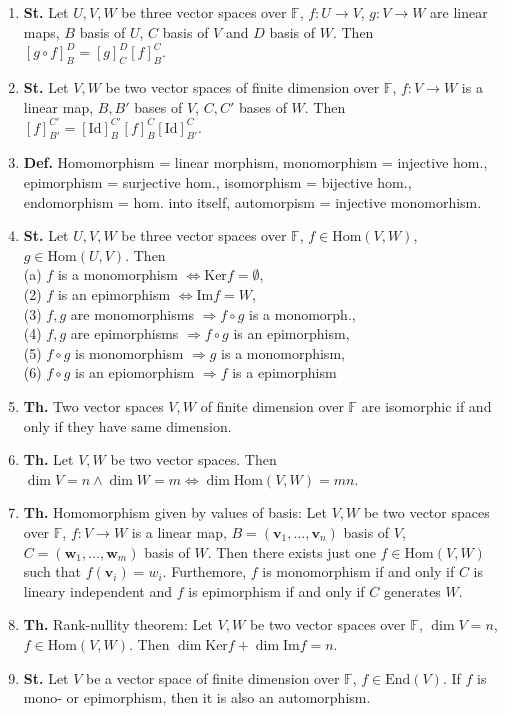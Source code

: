 \documentclass{article}
\newcommand{\<}{\left<}
\renewcommand{\>}{\right>}
\newcommand{\im}{\text{Im}}
\renewcommand{\ker}{\text{Ker}}
\renewcommand{\hom}{\text{Hom}}
\newcommand{\End}{\text{End}}
\newcommand{\F}{\mathbb{F}}
\newcommand{\define}{\textbf{Def. }}
\newcommand{\state}{\textbf{St. }}
\newcommand{\theor}{\textbf{Th. }}
\begin{document}
\begin{multicols}{3}
\begin{enumerate}[itemsep=2pt, topsep=2pt, partopsep=2pt, parsep=2pt]
        \item \state Let $U,V,W$ be three vector spaces over $\F$, $f:U\to V$, $g:V\to W$ are linear maps, $B$ basis of $U$, $C$ basis of $V$ and $D$ basis of $W$. Then $\left[g\circ f\right]_B^D=\left[g\right]_C^D\left[f\right]_B^C$.
        \item \state Let $V,W$ be two vector spaces of finite dimension over $\F$, $f:V\to W$ is a linear map, $B,B'$ bases of $V$, $C,C'$ bases of $W$. Then $\left[f\right]_{B'}^{C'}=\left[\text{Id}\right]_B^{C'}\left[f\right]_B^C\left[\text{Id}\right]_{B'}^C$.
        \item \define Homomorphism = linear morphism, monomorphism = injective hom., epimorphism = surjective hom., isomorphism = bijective hom., endomorphism = hom. into itself, automorpism = injective monomorhism.
        \item \state Let $U,V,W$ be three vector spaces over $\F$, $f\in\hom\left(V,W\right)$,  $g\in\hom\left(U,V\right)$. Then \\(a) $f$ is a monomorphism $\Longleftrightarrow\ker f=\emptyset$,\\(2) $f$ is an epimorphism $\Longleftrightarrow\im f=W$,\\(3) $f,g$ are monomorphisms $\Longrightarrow f\circ g$ is a monomorph.,\\(4) $f,g$ are epimorphisms $\Longrightarrow f\circ g$ is an epimorphism,\\(5) $f\circ g$ is monomorphism $\Longrightarrow g$ is a monomorphism,\\(6) $f\circ g$ is an epiomorphism $\Longrightarrow f$ is a epimorphism
        \item \theor Two vector spaces $V,W$ of finite dimension over $\F$ are isomorphic if and only if they have same dimension.
        \item \theor Let $V,W$ be two vector spaces. Then\\$\dim V=n\wedge\dim W=m\Longleftrightarrow\dim\hom\left(V,W\right)=mn$.
        \item \theor Homomorphism given by values of basis: Let $V,W$ be two vector spaces over $\F$, $f:V\to W$ is a linear map, $B=(\bm v_1,\ldots,\bm v_n)$ basis of $V$, $C=(\bm w_1,\ldots,\bm w_m)$ basis of $W$. Then there exists just one $f\in\hom\left(V,W\right)$ such that $f\left(\bm v_i\right)=w_i$. Furthemore, $f$ is monomorphism if and only if $C$ is lineary independent and $f$ is epimorphism if and only if $C$ generates $W$.
        \item \theor Rank-nullity theorem: Let $V,W$ be two vector spaces over $\F$, $\dim V=n$, $f\in\hom\left(V,W\right)$. Then $\dim\ker f+\dim\im f=n$.
        \item \state Let $V$ be a vector space of finite dimension over $\F$, $f\in\End\left(V\right)$. If $f$ is mono- or epimorphism, then it is also an automorphism.


\end{enumerate}
\end{multicols}
\end{document}
